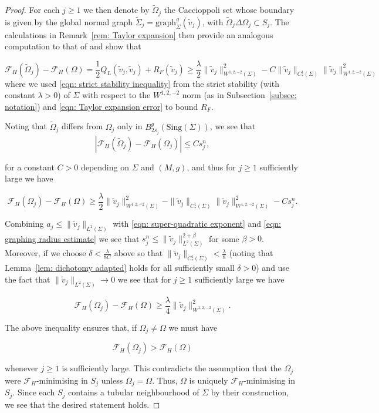 \documentclass[12pt]{article}
\begin{document}
\begin{proof}
    \bigskip
    
    For each $j \geq 1$ we then denote by $\widetilde\Omega_j$ the Caccioppoli set whose
    boundary is given by the global normal graph $\widetilde\Sigma_j = \mathrm{graph}^{g}_{\Sigma}(\widetilde v_j)$, with $\widetilde{\Omega}_j \Delta \Omega_j \subset S_j$. The calculations in Remark~\ref{rem: Taylor expansion} then provide an analogous computation to that of \cite[(1) in the proof of Theorem 2]{W94} and show that
    
    $$\mathcal{F}_H(\widetilde\Omega_j) - \mathcal{F}_H(\Omega) = \frac{1}{2}Q_L(\widetilde{v}_j,\widetilde{v}_j) + R_F(\widetilde{v}_j) \geq \frac{\lambda}{2}\|\widetilde{v}_j\|_{W^{1,2,-2}(\Sigma)}^2 - C\|\widetilde{v}_j\|_{C^1_*(\Sigma)}\|\widetilde{v}_j\|_{W^{1,2,-2}(\Sigma)}^2$$
    where we used \eqref{eqn: strict stability inequality} from the strict stability (with constant $\lambda > 0$) of $\Sigma$ with respect to the $W^{1,2,-2}$ norm (as in Subsection~\ref{subsec: notation}) and \eqref{eqn: Taylor expansion error} to bound $R_F$.

    \bigskip
    
    Noting that $\widetilde\Omega_j$ differs from $\Omega_j$ only in $B_{2s_j}^g(\mathrm{Sing}(\Sigma))$, we see that
    $$|\mathcal{F}_H(\widetilde\Omega_j) - \mathcal{F}_H(\Omega_j)| \leq Cs_j^n,$$

    for a constant $C > 0$ depending on $\Sigma$ and $(M,g)$, and thus for $j \geq 1$ sufficiently large we have 

    $$\mathcal{F}_H(\Omega_j) - \mathcal{F}_H(\Omega) \geq  \frac{\lambda}{2}\|\widetilde{v}_j\|_{W^{1,2,-2}(\Sigma)}^2  - \|\widetilde{v}_j\|_{C^1_*(\Sigma)}\|\widetilde{v}_j\|_{W^{1,2,-2}(\Sigma)}^2 - Cs_j^n.$$

    Combining $a_j \leq \|\widetilde{v}_j\|_{L^2(\Sigma)}$ with \eqref{eqn: super-quadratic exponent} and \eqref{eqn: graphing radius estimate} we see that $s_j^n \leq \|\widetilde{v}_j\|_{L^2(\Sigma)}^{2 + \beta}$ for some $\beta > 0$. Moreover, if we choose $\delta < \frac{\lambda}{8C}$ above so that $\|\widetilde{v}_j\|_{C^1_*(\Sigma)} < \frac{\lambda}{8}$ (noting that Lemma~\ref{lem: dichotomy adapted} holds for all sufficiently small $\delta > 0$) and use the fact that $\|\widetilde{v}_j\|_{L^2(\Sigma)} \rightarrow 0$ we see that for $j \geq 1$ sufficiently large we have
    
    $$\mathcal{F}_H(\Omega_j) - \mathcal{F}_H(\Omega) \geq  \frac{\lambda}{4}\|\widetilde{v}_j\|_{W^{1,2,-2}(\Sigma)}^2.$$
    
    
    The above inequality ensures that, if $\Omega_j \neq \Omega$ we must have
    
    $$\mathcal{F}_H(\Omega_j) > \mathcal{F}_H(\Omega)$$

    whenever $j \geq 1$ is sufficiently large. This contradicts the assumption that the $\Omega_j$ were $\mathcal{F}_H$-minimising in $S_j$ unless $\Omega_j = \Omega$. Thus, $\Omega$ is uniquely $\mathcal{F}_H$-minimising in $S_j$. Since each $S_j$ contains a tubular neighbourhood of $\Sigma$ by their construction, we see that the desired statement holds.
\end{proof}
\end{document}
